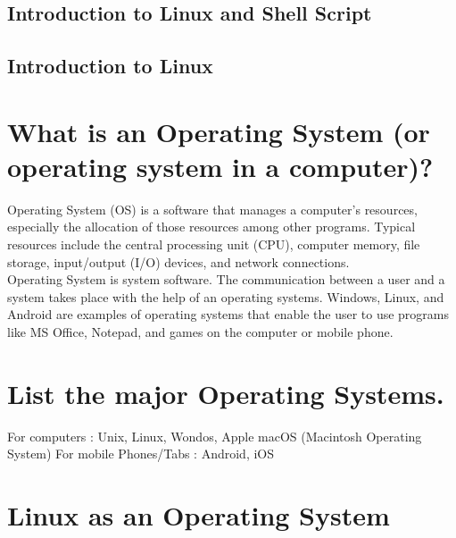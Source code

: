 \documentclass{article}
\begin{document}
\begin{center}
 \section*{Introduction to Linux and Shell Script}  
\end{center}


\begin{center}
 \section*{Introduction to Linux}  
\end{center}


\section*{What is an Operating System (or operating system in a computer)?}

\noindent
Operating System (OS) is a software that manages a computer's resources, especially the allocation of those resources among other programs. Typical resources include the central processing unit (CPU), computer memory, file storage, input/output (I/O) devices, and network connections.\\
Operating System is system software. The communication between a user and a system takes place with the help of an operating systems. Windows, Linux, and Android are examples of operating systems that enable the user to use programs like MS Office, Notepad, and games on the computer or mobile phone.
\\
\section*{List the major Operating Systems.}
\noindent
For computers : Unix, Linux, Wondos, Apple macOS (Macintosh Operating System)
For mobile Phones/Tabs : Android, iOS
\section*{Linux as an Operating System}
\end{document}
